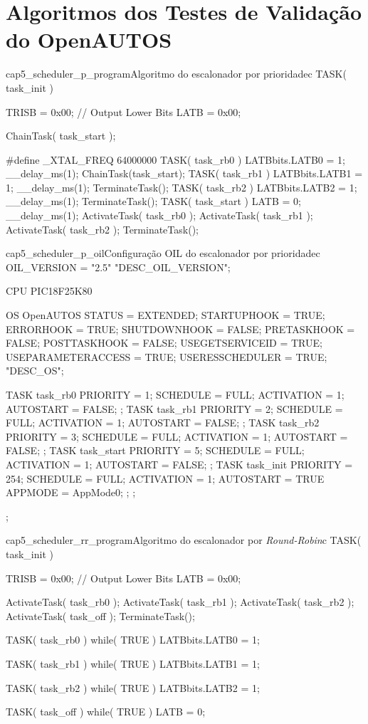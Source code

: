 \apendice
\chapter{Algoritmos dos Testes de Validação do OpenAUTOS} \label{ape:capA_validacao}

\begin{algoritmo}{cap5_scheduler_p_program}{Algoritmo do escalonador por prioridade}{c}
TASK( task_init ) {
	TRISB = 0x00; // Output Lower Bits
	LATB = 0x00;
	
	ChainTask( task_start );
}
#define _XTAL_FREQ 64000000
TASK( task_rb0 ) {
	LATBbits.LATB0 = 1;
	__delay_ms(1);
	ChainTask(task_start);	
}
TASK( task_rb1 ) {
	LATBbits.LATB1 = 1;
	__delay_ms(1);
	TerminateTask();
}
TASK( task_rb2 ) {
	LATBbits.LATB2 = 1;
	__delay_ms(1);
	TerminateTask();
}
TASK( task_start ) {
	LATB = 0;
	__delay_ms(1);
	ActivateTask( task_rb0 );
	ActivateTask( task_rb1 );
	ActivateTask( task_rb2 );
	TerminateTask();
}
\end{algoritmo}

\begin{algoritmo}{cap5_scheduler_p_oil}{Configuração OIL do escalonador por prioridade}{c}
OIL_VERSION = "2.5" "DESC_OIL_VERSION";

CPU PIC18F25K80 {
	OS OpenAUTOS {
		STATUS = EXTENDED;
		STARTUPHOOK = TRUE;
		ERRORHOOK = TRUE;
		SHUTDOWNHOOK = FALSE;
		PRETASKHOOK = FALSE;
		POSTTASKHOOK = FALSE;
		USEGETSERVICEID = TRUE;
		USEPARAMETERACCESS = TRUE;
		USERESSCHEDULER = TRUE;
	} "DESC_OS";
	
	TASK task_rb0 {
		PRIORITY = 1;
		SCHEDULE = FULL;
		ACTIVATION = 1;
		AUTOSTART = FALSE;
	};
	TASK task_rb1 {
		PRIORITY = 2;
		SCHEDULE = FULL;
		ACTIVATION = 1;
		AUTOSTART = FALSE;
	};
	TASK task_rb2 {
		PRIORITY = 3;
		SCHEDULE = FULL;
		ACTIVATION = 1;
		AUTOSTART = FALSE;
	};
	TASK task_start {
		PRIORITY = 5;
		SCHEDULE = FULL;
		ACTIVATION = 1;
		AUTOSTART = FALSE;
	};
	TASK task_init {
		PRIORITY = 254;
		SCHEDULE = FULL;
		ACTIVATION = 1;
		AUTOSTART = TRUE {
			APPMODE = AppMode0;
		};
	};	
};
\end{algoritmo}

\begin{algoritmo}{cap5_scheduler_rr_program}{Algoritmo do escalonador por \emph{Round-Robin}}{c}
TASK( task_init ) {
	TRISB = 0x00; // Output Lower Bits
	LATB = 0x00;
	
	ActivateTask( task_rb0 );
	ActivateTask( task_rb1 );
	ActivateTask( task_rb2 );
	ActivateTask( task_off );
	TerminateTask();
}

TASK( task_rb0 ) {
	while( TRUE ) {
		LATBbits.LATB0 = 1;
	}
}

TASK( task_rb1 ) {
	while( TRUE ) {
		LATBbits.LATB1 = 1;
	}
}

TASK( task_rb2 ) {
	while( TRUE ) {
		LATBbits.LATB2 = 1;
	}
}

TASK( task_off ) {	
	while( TRUE ) {
		LATB = 0;
	}
}
\end{algoritmo}

